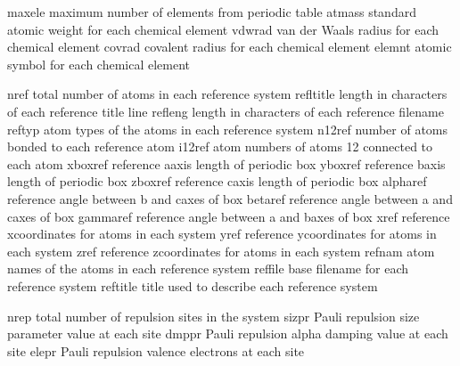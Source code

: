 \documentclass[letterpaper,11pt,english]{sphinxmanual}
\begin{document}
\begin{sphinxVerbatim}[commandchars=\\\{\}]
maxele          maximum number of elements from periodic table
atmass          standard atomic weight for each chemical element
vdwrad          van der Waals radius for each chemical element
covrad          covalent radius for each chemical element
elemnt          atomic symbol for each chemical element
\end{sphinxVerbatim}


\begin{sphinxVerbatim}[commandchars=\\\{\}]
nref            total number of atoms in each reference system
refltitle       length in characters of each reference title line
refleng         length in characters of each reference filename
reftyp          atom types of the atoms in each reference system
n12ref          number of atoms bonded to each reference atom
i12ref          atom numbers of atoms 1\PYGZhy{}2 connected to each atom
xboxref         reference a\PYGZhy{}axis length of periodic box
yboxref         reference b\PYGZhy{}axis length of periodic box
zboxref         reference c\PYGZhy{}axis length of periodic box
alpharef        reference angle between b\PYGZhy{} and c\PYGZhy{}axes of box
betaref         reference angle between a\PYGZhy{} and c\PYGZhy{}axes of box
gammaref        reference angle between a\PYGZhy{} and b\PYGZhy{}axes of box
xref            reference x\PYGZhy{}coordinates for atoms in each system
yref            reference y\PYGZhy{}coordinates for atoms in each system
zref            reference z\PYGZhy{}coordinates for atoms in each system
refnam          atom names of the atoms in each reference system
reffile         base filename for each reference system
reftitle        title used to describe each reference system
\end{sphinxVerbatim}


\begin{sphinxVerbatim}[commandchars=\\\{\}]
nrep            total number of repulsion sites in the system
sizpr           Pauli repulsion size parameter value at each site
dmppr           Pauli repulsion alpha damping value at each site
elepr           Pauli repulsion valence electrons at each site
\end{sphinxVerbatim}
\end{document}
